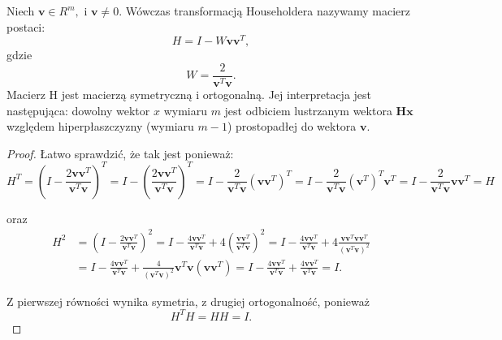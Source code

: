 \documentclass[12pt,a4paper]{report}
\newcommand{\vr}[1]{\mathbf{#1}}
\newcommand{\mx}[1]{{#1}}
\begin{document}
\begin{theorem} 
Niech  $\vr{v}\in R^{m}, $ i $\vr{v}\neq 0. $ Wówczas transformacją Householdera nazywamy macierz postaci:
$$
\mx{H}=\mx{I}-W\vr{v}\vr{v}^{T},
$$
gdzie
$$
W={\frac {2}{\vr{v}^{T}\vr{v}}}.
$$ 
Macierz H jest macierzą symetryczną i ortogonalną. 
Jej interpretacja jest następująca: dowolny wektor $x$ wymiaru $m$ jest odbiciem lustrzanym wektora $\vr{Hx}$ względem hiperpłaszczyzny (wymiaru $m-1$) prostopadłej do wektora $\vr{v}$.
\end{theorem} 

\begin{proof}
Łatwo sprawdzić, że tak jest ponieważ: 
$$
\mx{H}^{T}=\left(\mx{I}-{\frac {2\vr{v}\vr{v}^{T}}{\vr{v}^{T}\vr{v}}}\right)^{T}
= \mx{I}-\left({\frac {2\vr{v}\vr{v}^{T}}{\vr{v}^{T}\vr{v}}}\right)^{T}
= \mx{I}-\frac {2}{\vr{v}^{T}\vr{v}} (\vr{v}\vr{v}^{T})^{T}
= \mx{I}-\frac {2}{\vr{v}^{T}\vr{v}} (\vr{v}^{T})^{T} \vr{v}^{T}
= \mx{I} - \frac{2}{\vr{v}^{T}\vr{v}} \vr{v}\vr{v}^{T} 
= \mx{H}
$$

oraz
\begin{align*}
\mx{H}^{2}  &=\left(\mx{I}-{\frac {2\vr{v}\vr{v}^{T}}{\vr{v}^{T}\vr{v}}}\right)^{2}  
= \mx{I}-{\frac {4\vr{v}\vr{v}^{T}}{\vr{v}^{T}\vr{v}}}+4\left({\frac {\vr{v}\vr{v}^{T}}{\vr{v}^{T}\vr{v}}}\right)^{2}  
=\mx{I} - \frac{4\vr{v}\vr{v}^{T}}{\vr{v}^{T}\vr{v}} + 4 \frac{\vr{v}\vr{v}^{T}\vr{v}\vr{v}^{T}}{(\vr{v}^{T}\vr{v})^{2}} \\
&=  \mx{I} - \frac{4\vr{v}\vr{v}^{T}}{\vr{v}^{T}\vr{v}} +  \frac{4}{(\vr{v}^{T}\vr{v})^{2}} \vr{v}^{T}\vr{v}(\vr{v}\vr{v}^{T})  
= \mx{I} - \frac{4\vr{v}\vr{v}^{T}}{\vr{v}^{T}\vr{v}} +  \frac{4\vr{v}\vr{v}^{T}}{\vr{v}^{T}\vr{v}}  = \mx{I}.
\end{align*}



Z pierwszej równości wynika symetria, z drugiej ortogonalność, ponieważ 
$$
\mx{H}^{T}\mx{H}=\mx{H}\mx{H}=\mx{I}.
$$ 
\end{proof} 
\end{document}
